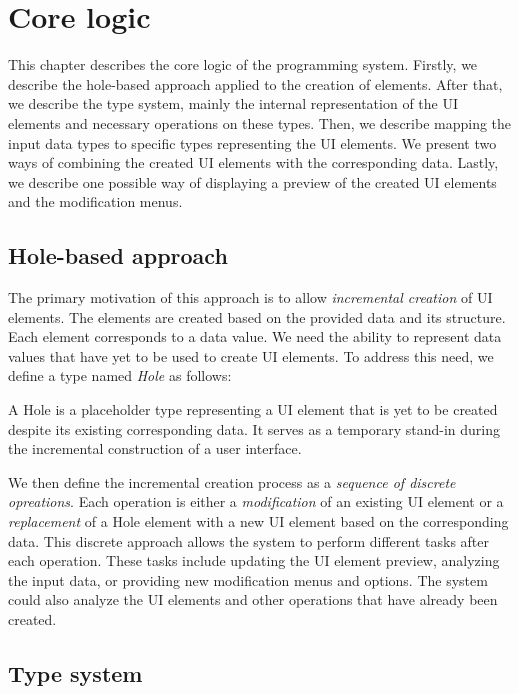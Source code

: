 \chapter{Core logic}
\label{chap:corelogic}

This chapter describes the core logic of the programming system.
Firstly, we describe the hole-based approach applied to the creation of elements.
After that, we describe the type system, mainly the internal representation of the UI elements and necessary operations on these types.
Then, we describe mapping the input data types to specific types representing the UI elements.
We present two ways of combining the created UI elements with the corresponding data.
Lastly, we describe one possible way of displaying a preview of the created UI elements and the modification menus.

\section{Hole-based approach}
The primary motivation of this approach is to allow \emph{incremental creation} of UI elements.
The elements are created based on the provided data and its structure.
Each element corresponds to a data value.
We need the ability to represent data values that have yet to be used to create UI elements.
To address this need, we define a type named \emph{Hole} as follows:
\begin{defn}
	A Hole is a placeholder type representing a UI element that is yet to be created despite its existing corresponding data. It serves as a temporary stand-in during the incremental construction of a user interface.
\end{defn}

We then define the incremental creation process as a \emph{sequence of discrete opreations}.
Each operation is either a \emph{modification} of an existing UI element or a \emph{replacement} of a Hole element with a new UI element based on the corresponding data.
This discrete approach allows the system to perform different tasks after each operation.
These tasks include updating the UI element preview, analyzing the input data, or providing new modification menus and options.
The system could also analyze the UI elements and other operations that have already been created.


\section{Type system}

